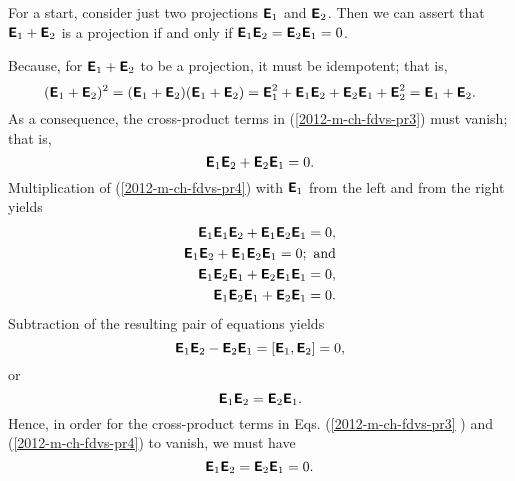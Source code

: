 {\color{OliveGreen}\bproof
For a start, consider just two projections
 $\textsf{\textbf{E}}_1$ and $\textsf{\textbf{E}}_2$.
Then we can assert that   $\textsf{\textbf{E}}_1 + \textsf{\textbf{E}}_2$ is a projection if and only if
 $\textsf{\textbf{E}}_1 \textsf{\textbf{E}}_2=\textsf{\textbf{E}}_2 \textsf{\textbf{E}}_1=0$.

Because, for
 $\textsf{\textbf{E}}_1 + \textsf{\textbf{E}}_2$ to be a projection, it must be idempotent; that is,
 \begin{equation}
(\textsf{\textbf{E}}_1 + \textsf{\textbf{E}}_2)^2 =
(\textsf{\textbf{E}}_1 + \textsf{\textbf{E}}_2)(\textsf{\textbf{E}}_1 + \textsf{\textbf{E}}_2)  =
\textsf{\textbf{E}}_1^2 +   \textsf{\textbf{E}}_1\textsf{\textbf{E}}_2 + \textsf{\textbf{E}}_2\textsf{\textbf{E}}_1 + \textsf{\textbf{E}}_2^2
=
 \textsf{\textbf{E}}_1 + \textsf{\textbf{E}}_2 .
\label{2012-m-ch-fdvs-pr3}
\end{equation}
As a consequence, the cross-product terms in (\ref{2012-m-ch-fdvs-pr3}) must vanish; that is,
\begin{equation}
\textsf{\textbf{E}}_1\textsf{\textbf{E}}_2 + \textsf{\textbf{E}}_2\textsf{\textbf{E}}_1 =0.
\label{2012-m-ch-fdvs-pr4}
\end{equation}
Multiplication of (\ref{2012-m-ch-fdvs-pr4}) with $\textsf{\textbf{E}}_1$ from the left and from the right yields
\begin{equation}
\begin{split}
\textsf{\textbf{E}}_1\textsf{\textbf{E}}_1\textsf{\textbf{E}}_2 + \textsf{\textbf{E}}_1\textsf{\textbf{E}}_2\textsf{\textbf{E}}_1 =0, \\
 \textsf{\textbf{E}}_1\textsf{\textbf{E}}_2 + \textsf{\textbf{E}}_1\textsf{\textbf{E}}_2\textsf{\textbf{E}}_1 =0;\textrm{ and} \\
\textsf{\textbf{E}}_1\textsf{\textbf{E}}_2\textsf{\textbf{E}}_1 + \textsf{\textbf{E}}_2\textsf{\textbf{E}}_1\textsf{\textbf{E}}_1 =0, \\
\textsf{\textbf{E}}_1\textsf{\textbf{E}}_2\textsf{\textbf{E}}_1 + \textsf{\textbf{E}}_2\textsf{\textbf{E}}_1  =0.
\end{split}
\label{2012-m-ch-fdvs-pr5}
\end{equation}
Subtraction of the resulting pair of equations yields
\begin{equation}
 \textsf{\textbf{E}}_1\textsf{\textbf{E}}_2 - \textsf{\textbf{E}}_2\textsf{\textbf{E}}_1  =
\left[ \textsf{\textbf{E}}_1,\textsf{\textbf{E}}_2 \right]
=0,
\label{2012-m-ch-fdvs-pr6}
\end{equation}
or
\begin{equation}
 \textsf{\textbf{E}}_1\textsf{\textbf{E}}_2 = \textsf{\textbf{E}}_2\textsf{\textbf{E}}_1 .
\label{2012-m-ch-fdvs-pr67}
\end{equation}
Hence, in order for the cross-product terms in Eqs. (\ref{2012-m-ch-fdvs-pr3} ) and (\ref{2012-m-ch-fdvs-pr4})
to vanish, we must have
\begin{equation}
 \textsf{\textbf{E}}_1\textsf{\textbf{E}}_2 = \textsf{\textbf{E}}_2\textsf{\textbf{E}}_1 =0.
\label{2012-m-ch-fdvs-pr8}
\end{equation}

}
